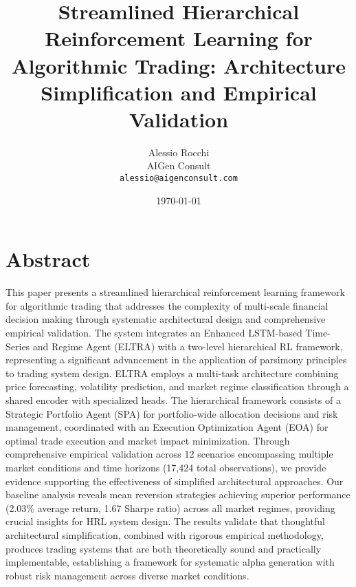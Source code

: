 \documentclass[11pt,a4paper]{article}
\begin{document}
\title{Streamlined Hierarchical Reinforcement Learning for Algorithmic Trading: Architecture Simplification and Empirical Validation}

\author{Alessio Rocchi  \\AIGen Consult\\\texttt{alessio@aigenconsult.com}}

\date{\today}

\maketitle








\section{Abstract}

This paper presents a streamlined hierarchical reinforcement learning framework for algorithmic trading that addresses the complexity of multi-scale financial decision making through systematic architectural design and comprehensive empirical validation. The system integrates an Enhanced LSTM-based Time-Series and Regime Agent (ELTRA) with a two-level hierarchical RL framework, representing a significant advancement in the application of parsimony principles to trading system design. ELTRA employs a multi-task architecture combining price forecasting, volatility prediction, and market regime classification through a shared encoder with specialized heads. The hierarchical framework consists of a Strategic Portfolio Agent (SPA) for portfolio-wide allocation decisions and risk management, coordinated with an Execution Optimization Agent (EOA) for optimal trade execution and market impact minimization. Through comprehensive empirical validation across 12 scenarios encompassing multiple market conditions and time horizons (17,424 total observations), we provide evidence supporting the effectiveness of simplified architectural approaches. Our baseline analysis reveals mean reversion strategies achieving superior performance (2.03\% average return, 1.67 Sharpe ratio) across all market regimes, providing crucial insights for HRL system design. The results validate that thoughtful architectural simplification, combined with rigorous empirical methodology, produces trading systems that are both theoretically sound and practically implementable, establishing a framework for systematic alpha generation with robust risk management across diverse market conditions.
\end{document}
